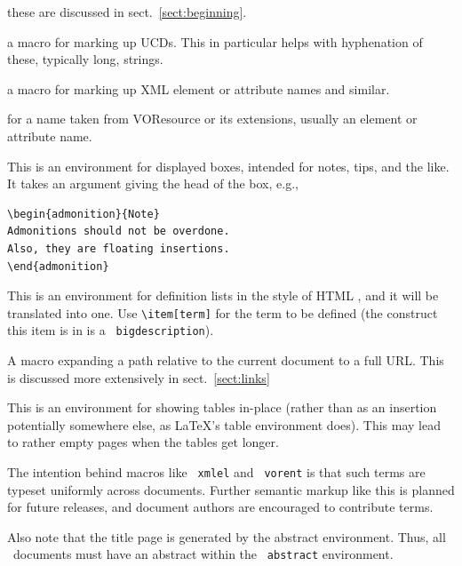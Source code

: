 \documentclass[11pt,a4paper]{ivoa}
\newcommand{\texword}[1]{\texttt{\color{texcolor} #1}}
\begin{document}
\begin{bigdescription}
\item[\texword{author}, \texword{previousversion}, \texword{ivoagroup}] these are discussed
in sect.~\ref{sect:beginning}.
\item[\texword{ucd}] a macro for marking up UCDs.  This in particular
helps with hyphenation of these, typically long, strings.
\item[\texword{xmlel}] a macro for marking up XML element or attribute
names and similar.  
\item[\texword{vorent}] for a name taken from VOResource or its
extensions, usually an
element or attribute name.
\item[\texword{admonition}] This is an environment for 
displayed boxes, intended for notes, tips, and the like.  
It takes an argument giving the head of the box, e.g.,

\begin{lstlisting}
\begin{admonition}{Note}
Admonitions should not be overdone.  
Also, they are floating insertions.
\end{admonition}
\end{lstlisting}
\item[\texword{bigdescription}] This is an environment for definition
lists in the style of HTML , and it will be translated into
one.  Use \verb|\item[term]| for the term to be defined
(the construct this item is in is a \texword{bigdescription}).
\item[\texword{auxilaryurl}] A macro expanding a path relative to the
current document to a full URL.  This is discussed more extensively in
sect.~\ref{sect:links}
\item[\texword{inlinetable}] This is an environment for showing tables
in-place (rather than as an insertion potentially somewhere else, as
LaTeX's table environment does).  This may lead to rather empty pages
when the tables get longer.
\end{bigdescription}

The intention behind macros like \texword{xmlel} and \texword{vorent} is
that such terms are typeset uniformly across documents.  Further
semantic markup like this is planned for future releases, and document
authors are encouraged to contribute terms.

Also note that the title page is generated by the abstract environment.
Thus, all \ivoatex\ documents must have an abstract within the
\texword{abstract} environment.
\end{document}
